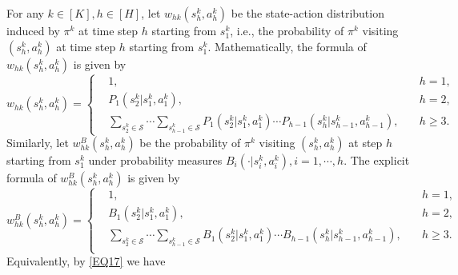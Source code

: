 \documentclass[11pt]{article}
\newcommand{\1}{\mathbbm{1}}
\begin{document}
For any $k\in [K],h\in [H]$, let $w_{hk}(s_h^k,a_h^k)$ be the state-action distribution induced by $\pi^k$ at time step $h$ starting from $s_1^k$, i.e., the probability of $\pi^k$ visiting $(s_h^k,a_h^k)$ at time step $h$ starting from $s_1^k$.
Mathematically, the formula of $w_{hk}(s_h^k,a_h^k)$ is given by
\begin{equation}\label{SSS4}
w_{hk}(s_h^k,a_h^k)=\left\{
	\begin{aligned}
	&1, \quad &h=1,\\
	&P_{1}(s_{2}^k\vert s_1^k,a_1^k), \quad &h=2,\\
	&\sum_{s_{2}^k\in \mathcal{S}}\cdots \sum_{s_{h-1}^k\in \mathcal{S}}P_{1}(s_{2}^k\vert s_1^k,a_1^k)\cdots P_{h-1}(s_{h}^k\vert s_{h-1}^k,a_{h-1}^k), \quad &h\geq 3.
	\end{aligned}
	\right
	.
\end{equation}
Similarly, let $w_{hk}^{B}(s_h^k,a_h^k)$ be the probability of $\pi^k$ visiting $(s_h^k,a_h^k)$ at step $h$ starting from $s_1^k$ under probability measures $B_i(\cdot\vert s_i^k,a_i^k),i=1,\cdots,h$. 
The explicit formula of $w_{hk}^{B}(s_h^k,a_h^k)$ is given by
\begin{equation}\label{S4}
w_{hk}^{B}(s_h^k,a_h^k)=\left\{
	\begin{aligned}
	&1, \quad &h=1,\\
	&B_{1}(s_{2}^k\vert s_1^k,a_1^k), \quad &h=2,\\
	&\sum_{s_{2}^k\in \mathcal{S}}\cdots \sum_{s_{h-1}^k\in \mathcal{S}}B_{1}(s_{2}^k\vert s_1^k,a_1^k)\cdots B_{h-1}(s_{h}^k\vert s_{h-1}^k,a_{h-1}^k), \quad &h\geq 3.\\
	\end{aligned}
	\right
	.
\end{equation}
Equivalently, by \eqref{EQ17} we have
\end{document}
